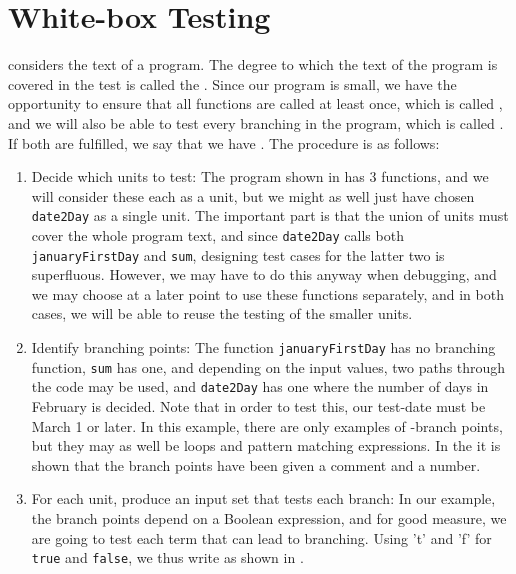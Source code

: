 \documentclass[fsharpNotes.tex]{subfiles}
\begin{document}
\section{White-box Testing}
 considers the text of a program. The degree to which the text of the program is covered in the test is called the . Since our program is small, we have the opportunity to ensure that all functions are called at least once, which is called , and we will also be able to test every branching in the program, which is called . If both are fulfilled, we say that we have . The procedure is as follows:
\begin{enumerate}
\item Decide which units to test: The program shown in  has 3 functions, and we will consider these each as a unit, but we might as well just have chosen \lstinline!date2Day! as a single unit. The important part is that the union of units must cover the whole program text, and since \lstinline!date2Day! calls both \lstinline!januaryFirstDay! and \lstinline!sum!, designing test cases for the latter two is superfluous. However, we may have to do this anyway when debugging, and we may choose at a later point to use these functions separately, and in both cases, we will be able to reuse the testing of the smaller units.
\item Identify branching points: The function \lstinline!januaryFirstDay! has no branching function, \lstinline!sum! has one, and depending on the input values, two paths through the code may be used, and \lstinline!date2Day! has one where the number of days in February is decided. Note that in order to test this, our test-date must be March 1 or later. In this example, there are only examples of -branch points, but they may as well be loops and pattern matching expressions. In the  it is shown that the branch points have been given a comment and a number.
 \item For each unit, produce an input set that tests each branch: In our example, the branch points depend on a Boolean expression, and for good measure, we are going to test each term that can lead to branching. Using 't' and 'f' for \lstinline{true} and \lstinline{false}, we thus write as shown in .
   \begin{table}

\end{table}
\end{enumerate}
\end{document}

